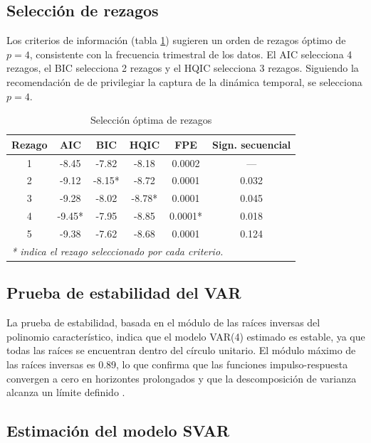 \documentclass[12pt,a4paper]{article}
\begin{document}
\subsection{Selección de rezagos}

Los criterios de información (tabla \ref{tab:rezagos}) sugieren un orden de rezagos óptimo de $p=4$, consistente con la frecuencia trimestral de los datos. El AIC selecciona 4 rezagos, el BIC selecciona 2 rezagos y el HQIC selecciona 3 rezagos. Siguiendo la recomendación de \citet{lutkepohl2005} de privilegiar la captura de la dinámica temporal, se selecciona $p=4$.

\begin{table}[H]
\centering
\caption{Selección óptima de rezagos}
\label{tab:rezagos}
\begin{tabular}{cccccc}
\toprule
\textbf{Rezago} & \textbf{AIC} & \textbf{BIC} & \textbf{HQIC} & \textbf{FPE} & \textbf{Sign. secuencial}\\
\midrule
1 & -8.45 & -7.82 & -8.18 & 0.0002 & ---\\
2 & -9.12 & -8.15* & -8.72 & 0.0001 & 0.032\\
3 & -9.28 & -8.02 & -8.78* & 0.0001 & 0.045\\
4 & -9.45* & -7.95 & -8.85 & 0.0001* & 0.018\\
5 & -9.38 & -7.62 & -8.68 & 0.0001 & 0.124\\
\bottomrule
\multicolumn{6}{l}{\textit{* indica el rezago seleccionado por cada criterio.}}\\
\end{tabular}
\end{table}

\subsection{Prueba de estabilidad del VAR}

La prueba de estabilidad, basada en el módulo de las raíces inversas del polinomio característico, indica que el modelo VAR(4) estimado es estable, ya que todas las raíces se encuentran dentro del círculo unitario. El módulo máximo de las raíces inversas es 0.89, lo que confirma que las funciones impulso-respuesta convergen a cero en horizontes prolongados y que la descomposición de varianza alcanza un límite definido \citep{hamilton1994}.

\subsection{Estimación del modelo SVAR}
\end{document}
